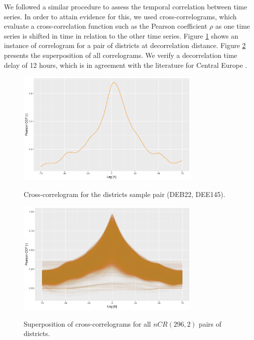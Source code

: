 We followed a similar procedure to assess the temporal correlation between time series.
In order to attain evidence for this, we used cross-correlograms, which evaluate a cross-correlation function such as the Pearson coefficient $\rho$ as one time series is shifted in time in relation to the other time series.
Figure \ref{fig:ccf} shows an instance of correlogram for a pair of districts at decorrelation distance.
Figure \ref{fig:ccf_all} presents the superposition of all correlograms.
We verify a decorrelation time delay of 12 hours, which is in agreement with the literature for Central Europe \cite{engeland2017variability}.

\begin{figure}[H]%
   \centering
    \caption{Cross-correlogram for the districts sample pair (DEB22, DEE145).}
    \includegraphics[width=0.8\textwidth]{ccf-sample_20200630_072805}
   \label{fig:ccf}
\end{figure}

\begin{figure}[H]%
   \centering
    \caption{Superposition of cross-correlograms for all $nCR(296, 2)$ pairs of districts.}
    \includegraphics[width=0.8\textwidth]{ccf-all_fav}
   \label{fig:ccf_all}
\end{figure}


